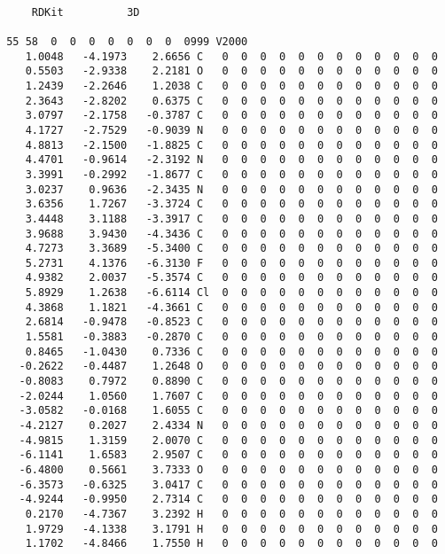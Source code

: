 \documentclass[11pt]{article}
\begin{document}
    \begin{Verbatim}[commandchars=\\\{\}]

     RDKit          3D

 55 58  0  0  0  0  0  0  0  0999 V2000
    1.0048   -4.1973    2.6656 C   0  0  0  0  0  0  0  0  0  0  0  0
    0.5503   -2.9338    2.2181 O   0  0  0  0  0  0  0  0  0  0  0  0
    1.2439   -2.2646    1.2038 C   0  0  0  0  0  0  0  0  0  0  0  0
    2.3643   -2.8202    0.6375 C   0  0  0  0  0  0  0  0  0  0  0  0
    3.0797   -2.1758   -0.3787 C   0  0  0  0  0  0  0  0  0  0  0  0
    4.1727   -2.7529   -0.9039 N   0  0  0  0  0  0  0  0  0  0  0  0
    4.8813   -2.1500   -1.8825 C   0  0  0  0  0  0  0  0  0  0  0  0
    4.4701   -0.9614   -2.3192 N   0  0  0  0  0  0  0  0  0  0  0  0
    3.3991   -0.2992   -1.8677 C   0  0  0  0  0  0  0  0  0  0  0  0
    3.0237    0.9636   -2.3435 N   0  0  0  0  0  0  0  0  0  0  0  0
    3.6356    1.7267   -3.3724 C   0  0  0  0  0  0  0  0  0  0  0  0
    3.4448    3.1188   -3.3917 C   0  0  0  0  0  0  0  0  0  0  0  0
    3.9688    3.9430   -4.3436 C   0  0  0  0  0  0  0  0  0  0  0  0
    4.7273    3.3689   -5.3400 C   0  0  0  0  0  0  0  0  0  0  0  0
    5.2731    4.1376   -6.3130 F   0  0  0  0  0  0  0  0  0  0  0  0
    4.9382    2.0037   -5.3574 C   0  0  0  0  0  0  0  0  0  0  0  0
    5.8929    1.2638   -6.6114 Cl  0  0  0  0  0  0  0  0  0  0  0  0
    4.3868    1.1821   -4.3661 C   0  0  0  0  0  0  0  0  0  0  0  0
    2.6814   -0.9478   -0.8523 C   0  0  0  0  0  0  0  0  0  0  0  0
    1.5581   -0.3883   -0.2870 C   0  0  0  0  0  0  0  0  0  0  0  0
    0.8465   -1.0430    0.7336 C   0  0  0  0  0  0  0  0  0  0  0  0
   -0.2622   -0.4487    1.2648 O   0  0  0  0  0  0  0  0  0  0  0  0
   -0.8083    0.7972    0.8890 C   0  0  0  0  0  0  0  0  0  0  0  0
   -2.0244    1.0560    1.7607 C   0  0  0  0  0  0  0  0  0  0  0  0
   -3.0582   -0.0168    1.6055 C   0  0  0  0  0  0  0  0  0  0  0  0
   -4.2127    0.2027    2.4334 N   0  0  0  0  0  0  0  0  0  0  0  0
   -4.9815    1.3159    2.0070 C   0  0  0  0  0  0  0  0  0  0  0  0
   -6.1141    1.6583    2.9507 C   0  0  0  0  0  0  0  0  0  0  0  0
   -6.4800    0.5661    3.7333 O   0  0  0  0  0  0  0  0  0  0  0  0
   -6.3573   -0.6325    3.0417 C   0  0  0  0  0  0  0  0  0  0  0  0
   -4.9244   -0.9950    2.7314 C   0  0  0  0  0  0  0  0  0  0  0  0
    0.2170   -4.7367    3.2392 H   0  0  0  0  0  0  0  0  0  0  0  0
    1.9729   -4.1338    3.1791 H   0  0  0  0  0  0  0  0  0  0  0  0
    1.1702   -4.8466    1.7550 H   0  0  0  0  0  0  0  0  0  0  0  0

\end{Verbatim}
\end{document}
